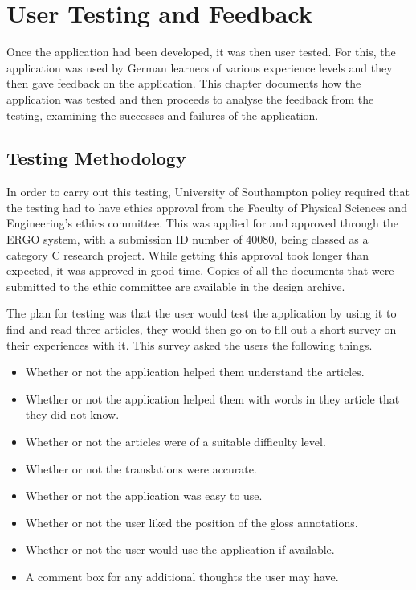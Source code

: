 \chapter{User Testing and Feedback}

Once the application had been developed, it was then user tested. For this, the application was used by German learners of various experience levels and they then gave feedback on the application. This chapter documents how the application was tested and then proceeds to analyse the feedback from the testing, examining the successes and failures of the application.

\section{Testing Methodology}

In order to carry out this testing, University of Southampton policy required that the testing had to have ethics approval from the Faculty of Physical Sciences and Engineering's ethics committee. This was applied for and approved through the ERGO system, with a submission ID number of 40080, being classed as a category C research project. While getting this approval took longer than expected, it was approved in good time. Copies of all the documents that were submitted to the ethic committee are available in the design archive. 

The plan for testing was that the user would test the application by using it to find and read three articles, they would then go on to fill out a short survey on their experiences with it. This survey asked the users the following things. 
\begin{itemize}
	\item Whether or not the application helped them understand the articles.
	
	\item Whether or not the application helped them with words in they article that they did not know.
	
	\item Whether or not the articles were of a suitable difficulty level.
	
	\item Whether or not the translations were accurate.
	
	\item Whether or not the application was easy to use.
	
	\item Whether or not the user liked the position of the gloss annotations.
	
	\item Whether or not the user would use the application if available. 
	
	\item A comment box for any additional thoughts the user may have. 
\end{itemize}


